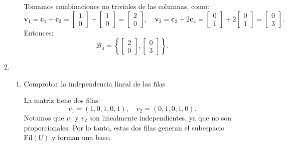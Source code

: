 \begin{enumerate}[label=\color{red}\textbf{\arabic*)}]
\begin{enumerate}[label=\color{red}\textbf{\alph*)}]
\begin{enumerate}[label=Paso \arabic*:]
                    Tomamos combinaciones no triviales de las columnas, como: \[
                    \mathbf{v}_1=\mathbf{c}_1+\mathbf{c}_3=\begin{bmatrix} 
                    1\\ 0 
                    \end{bmatrix} +\begin{bmatrix} 
                    1\\ 0 
                    \end{bmatrix} =\begin{bmatrix} 
                    2\\ 0 
                    \end{bmatrix} ,\quad \mathbf{v}_2=\mathbf{c}_2+2\mathbf{c}_4=\begin{bmatrix} 
                    0\\ 1 
                    \end{bmatrix} +2\begin{bmatrix} 
                    0\\ 1 
                    \end{bmatrix} =\begin{bmatrix} 
                    0\\ 3 
                    \end{bmatrix} .
                    \] 
                    Entonces: \[
                    \mathcal{B}_3=\left\{ \begin{bmatrix} 
                    2\\ 0 
                    \end{bmatrix},\begin{bmatrix} 
                    0\\ 3 
                    \end{bmatrix}   \right\} .
                    \] 
            \end{enumerate}
        \item {} 
            \begin{enumerate}[label=Paso \arabic*:]
                \item Comprobar la independencia lineal de las filas

                    La matriz tiene dos filas: \[
                    v_1=(1,0,1,0,1),\quad v_2=(0,1,0,1,0).
                    \] 
                    Notamos que $v_1$ y $v_2$ son linealmente independientes, ya que no son proporcionales. Por lo tanto, estas dos filas generan el subespacio $\mathrm{Fil}(U)$ y forman una base.


\end{enumerate}
\end{enumerate}
\end{enumerate}
